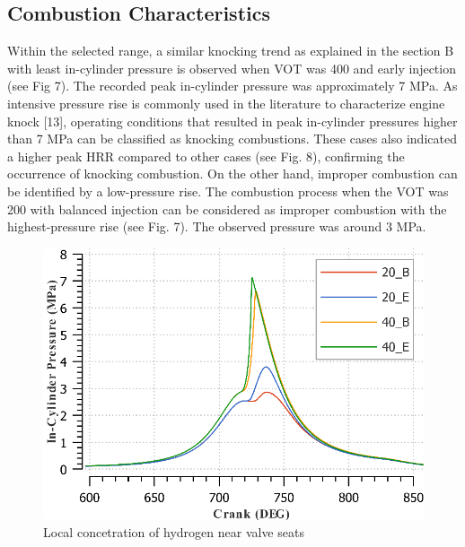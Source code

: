 \documentclass[conference]{IEEEtran}
\begin{document}
\subsection{Combustion Characteristics}
Within the selected range, a similar knocking trend as explained in the section B with least in-cylinder pressure is observed when VOT was 400 and early injection (see Fig 7). The recorded peak in-cylinder pressure was approximately 7 MPa. As intensive pressure rise is commonly used in the literature to characterize engine knock [13], operating conditions that resulted in peak in-cylinder pressures higher than 7 MPa can be classified as knocking combustions. These cases also indicated a higher peak HRR compared to other cases (see Fig. 8), confirming the occurrence of knocking combustion. On the other hand, improper combustion can be identified by a low-pressure rise. The combustion process when the VOT was 200 with balanced injection can be considered as improper combustion with the highest-pressure rise (see Fig. 7). The observed pressure was around 3 MPa.\\

\begin{figure}[htbp]
    \centerline{\includegraphics{plots and graphs/7.png}}
    \caption{Local concetration of hydrogen near valve seats}
    \label{plt_7}
    \end{figure}
\end{document}
